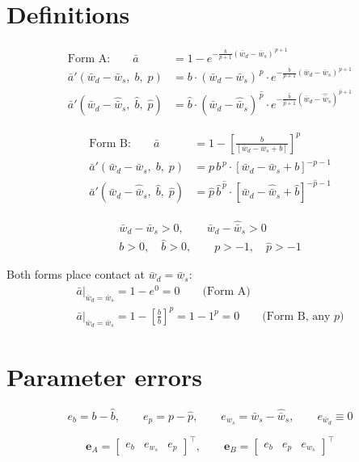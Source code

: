 \documentclass[11pt,a4paper,fontset=none]{ctexart}
\newcommand{\wt}{\left(\bar w_d-\bar w_s\right)}
\newcommand{\wh}{\left(\bar w_d-\hat{\bar w}_s\right)}
\newcommand{\wtb}{\bar w_d-\bar w_s}
\newcommand{\whb}{\bar w_d-\hat{\bar w}_s}
\newcommand{\bt}{\left[\bar w_d-\bar w_s+b\right]}
\newcommand{\bh}{\left[\bar w_d-\hat{\bar w}_s+\hat b\right]}
\newcommand{\ap}{\bar a'}
\begin{document}
\section{Definitions}

\begin{align}
\text{Form A:}\qquad
\bar a &= 1-e^{-\frac{b}{p+1}\wt^{\,p+1}}
\\[0.4em]
\ap\!\left(\wtb,\;b,\;p\right)
&= b\cdot\wt^{\,p}\cdot e^{-\frac{b}{p+1}\wt^{\,p+1}}
\\[0.4em]
\ap\!\left(\whb,\;\hat b,\;\hat p\right)
&= \hat b\cdot\wh^{\,\hat p}\cdot e^{-\frac{\hat b}{\hat p+1}\wh^{\,\hat p+1}}
\end{align}

\begin{align}
\text{Form B:}\qquad
\bar a &= 1-\left[\frac{b}{\bt}\right]^{p}
\\[0.4em]
\ap\!\left(\wtb,\;b,\;p\right)
&= p\,b^{\,p}\cdot\bt^{-p-1}
\\[0.4em]
\ap\!\left(\whb,\;\hat b,\;\hat p\right)
&= \hat p\,\hat b^{\,\hat p}\cdot\bh^{-\hat p-1}
\end{align}

\begin{gather}
\bar w_d-\bar w_s>0,
\qquad
\bar w_d-\hat{\bar w}_s>0
\\[0.4em]
b>0,\quad \hat b>0,
\qquad
p>-1,\quad \hat p>-1
\end{gather}

Both forms place contact at $\bar w_d=\bar w_s$:
\begin{gather}
\bar a\Big|_{\bar w_d=\bar w_s}=1-e^{0}=0
\qquad\text{(Form A)}
\\[0.4em]
\bar a\Big|_{\bar w_d=\bar w_s}
=1-\left[\frac{b}{b}\right]^{p}
=1-1^{p}=0
\qquad\text{(Form B, any }p\text{)}
\end{gather}

\section{Parameter errors}

\begin{equation}
e_{b}=b-\hat b,
\qquad
e_{p}=p-\hat p,
\qquad
e_{w_s}=\bar w_s-\hat{\bar w}_s,
\qquad
e_{\bar w_d}\equiv 0
\end{equation}

\begin{equation}
\bm{e}_A=\begin{bmatrix}e_{b}&e_{w_s}&e_{p}\end{bmatrix}^{\!\top},
\qquad
\bm{e}_B=\begin{bmatrix}e_{b}&e_{p}&e_{w_s}\end{bmatrix}^{\!\top}
\end{equation}
\end{document}
